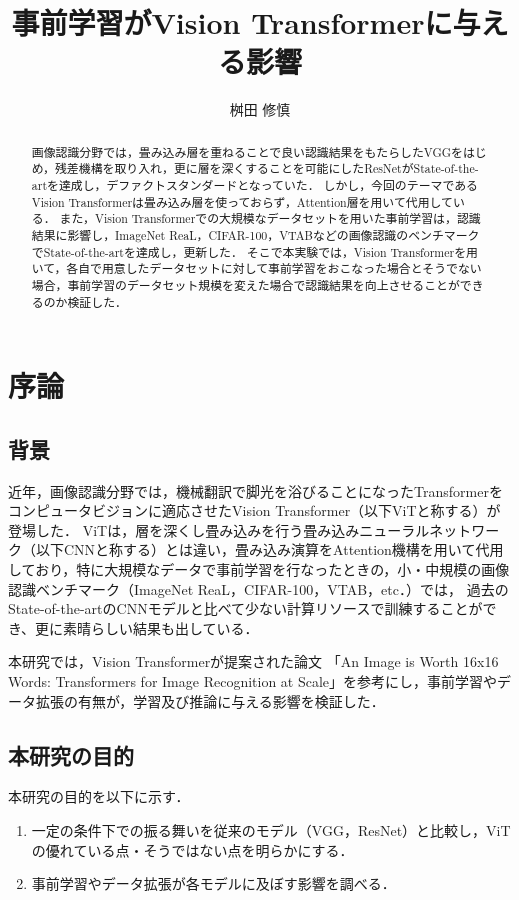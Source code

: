 \documentclass[a4paper, oneside, openany, dvipdfmx]{suribt}%
\title{事前学習がVision Transformerに与える影響}
\author{桝田 修慎}
\begin{document}
\maketitle%

\frontmatter%
\begin{abstract}%
画像認識分野では，畳み込み層を重ねることで良い認識結果をもたらしたVGGをはじめ，残差機構を取り入れ，更に層を深くすることを可能にしたResNetがState-of-the-artを達成し，デファクトスタンダードとなっていた．
しかし，今回のテーマであるVision Transformerは畳み込み層を使っておらず，Attention層を用いて代用している．
また，Vision Transformerでの大規模なデータセットを用いた事前学習は，認識結果に影響し，ImageNet ReaL，CIFAR-100，VTABなどの画像認識のベンチマークでState-of-the-artを達成し，更新した．
そこで本実験では，Vision Transformerを用いて，各自で用意したデータセットに対して事前学習をおこなった場合とそうでない場合，事前学習のデータセット規模を変えた場合で認識結果を向上させることができるのか検証した．

\end{abstract}

\setcounter{tocdepth}{2}
\tableofcontents%

\mainmatter%
\chapter{序論}
\section{背景}
近年，画像認識分野では，機械翻訳で脚光を浴びることになったTransformer\cite{vaswani2017attention}をコンピュータビジョンに適応させたVision Transformer（以下ViTと称する）が登場した\cite{dosovitskiy2021image}．
ViTは，層を深くし畳み込みを行う畳み込みニューラルネットワーク（以下CNNと称する）とは違い，畳み込み演算をAttention機構を用いて代用しており，特に大規模なデータで事前学習を行なったときの，小・中規模の画像認識ベンチマーク（ImageNet ReaL，CIFAR-100，VTAB，etc．）では，
過去のState-of-the-artのCNNモデルと比べて少ない計算リソースで訓練することができ、更に素晴らしい結果も出している．

本研究では，Vision Transformerが提案された論文
「An Image is Worth 16x16 Words: Transformers for Image Recognition at Scale」を参考にし，事前学習やデータ拡張の有無が，学習及び推論に与える影響を検証した．
\section{本研究の目的}
本研究の目的を以下に示す．
\begin{enumerate}
  \item 一定の条件下での振る舞いを従来のモデル（VGG，ResNet）と比較し，ViTの優れている点・そうではない点を明らかにする．
  \item 事前学習やデータ拡張が各モデルに及ぼす影響を調べる．
\end{enumerate}
\end{document}
